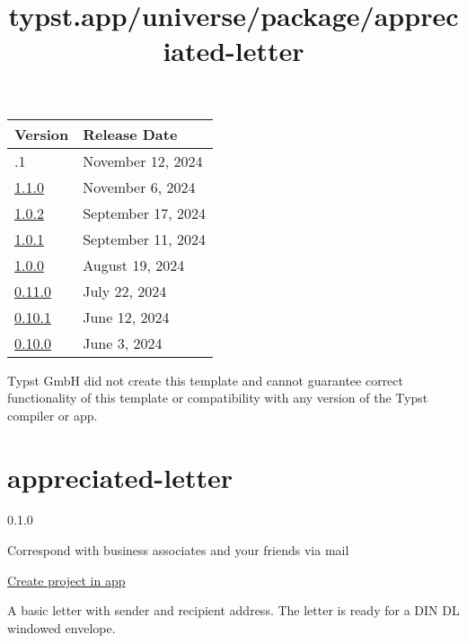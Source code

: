 \begin{longtable}[]{@{}ll@{}}
\toprule\noalign{}
Version & Release Date \\
\midrule\noalign{}
\endhead
\bottomrule\noalign{}
\endlastfoot
1.1.1 & November 12, 2024 \\
\href{https://typst.app/universe/package/unofficial-fhict-document-template/1.1.0/}{1.1.0}
& November 6, 2024 \\
\href{https://typst.app/universe/package/unofficial-fhict-document-template/1.0.2/}{1.0.2}
& September 17, 2024 \\
\href{https://typst.app/universe/package/unofficial-fhict-document-template/1.0.1/}{1.0.1}
& September 11, 2024 \\
\href{https://typst.app/universe/package/unofficial-fhict-document-template/1.0.0/}{1.0.0}
& August 19, 2024 \\
\href{https://typst.app/universe/package/unofficial-fhict-document-template/0.11.0/}{0.11.0}
& July 22, 2024 \\
\href{https://typst.app/universe/package/unofficial-fhict-document-template/0.10.1/}{0.10.1}
& June 12, 2024 \\
\href{https://typst.app/universe/package/unofficial-fhict-document-template/0.10.0/}{0.10.0}
& June 3, 2024 \\
\end{longtable}

Typst GmbH did not create this template and cannot guarantee correct
functionality of this template or compatibility with any version of the
Typst compiler or app.


\title{typst.app/universe/package/appreciated-letter}

\label{banner}
\label{template-thumbnail}

\section{appreciated-letter}\label{appreciated-letter}

{ 0.1.0 }

Correspond with business associates and your friends via mail

\href{/app?template=appreciated-letter&version=0.1.0}{Create project in
app}

\label{readme}
A basic letter with sender and recipient address. The letter is ready
for a DIN DL windowed envelope.

